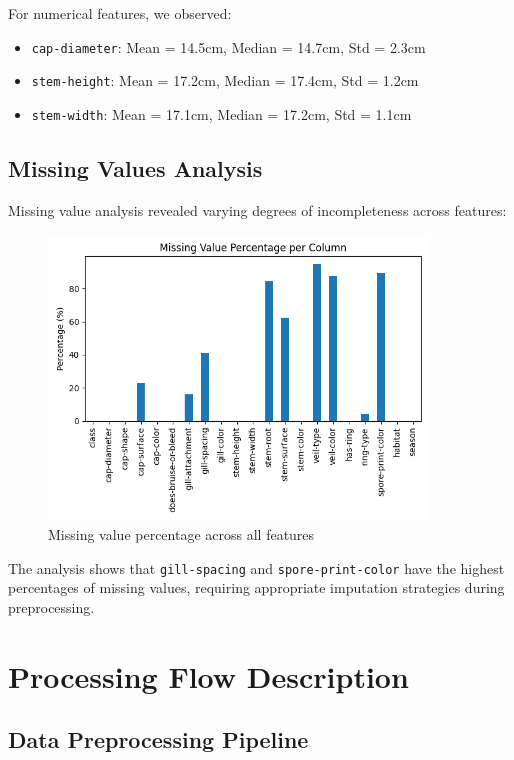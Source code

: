 \documentclass[11pt,a4paper]{article}
\begin{document}
For numerical features, we observed:
\begin{itemize}
    \item \texttt{cap-diameter}: Mean = 14.5cm, Median = 14.7cm, Std = 2.3cm
    \item \texttt{stem-height}: Mean = 17.2cm, Median = 17.4cm, Std = 1.2cm  
    \item \texttt{stem-width}: Mean = 17.1cm, Median = 17.2cm, Std = 1.1cm
\end{itemize}

\subsection{Missing Values Analysis}

Missing value analysis revealed varying degrees of incompleteness across features:

\begin{figure}[H]
    \centering
    \includegraphics[width=0.9\textwidth]{figures/eda_missing.png}
    \caption{Missing value percentage across all features}
    \label{fig:missing_values}
\end{figure}

The analysis shows that \texttt{gill-spacing} and \texttt{spore-print-color} have the highest percentages of missing values, requiring appropriate imputation strategies during preprocessing.

\section{Processing Flow Description}
\label{sec:processing}

\subsection{Data Preprocessing Pipeline}
\end{document}
